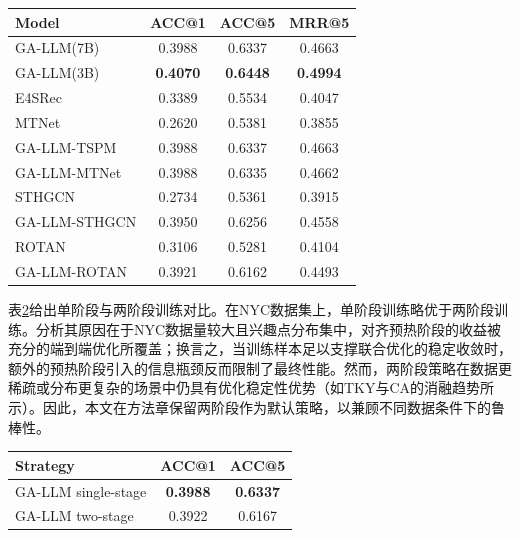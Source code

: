 \begin{table}[htbp]
    \tblstyle
    \label{tab:c4-llm-scale}
    \begin{tabular}{lccc}
        \toprule
        Model & ACC@1 & ACC@5 & MRR@5 \\
        \midrule
        GA-LLM(7B) & 0.3988 & 0.6337 & 0.4663 \\
        GA-LLM(3B) & \textbf{0.4070} & \textbf{0.6448} & \textbf{0.4994} \\
        E4SRec & 0.3389 & 0.5534 & 0.4047 \\
        MTNet & 0.2620 & 0.5381 & 0.3855 \\
        GA-LLM-TSPM & 0.3988 & 0.6337 & 0.4663 \\
        GA-LLM-MTNet & 0.3988 & 0.6335 & 0.4662 \\
        STHGCN & 0.2734 & 0.5361 & 0.3915 \\
        GA-LLM-STHGCN & 0.3950 & 0.6256 & 0.4558 \\
        ROTAN & 0.3106 & 0.5281 & 0.4104 \\
        GA-LLM-ROTAN & 0.3921 & 0.6162 & 0.4493 \\
        \bottomrule
    \end{tabular}
\end{table}

表\ref{tab:c4-train-strategy}给出单阶段与两阶段训练对比。在NYC数据集上，单阶段训练略优于两阶段训练。分析其原因在于NYC数据量较大且兴趣点分布集中，对齐预热阶段的收益被充分的端到端优化所覆盖；换言之，当训练样本足以支撑联合优化的稳定收敛时，额外的预热阶段引入的信息瓶颈反而限制了最终性能。然而，两阶段策略在数据更稀疏或分布更复杂的场景中仍具有优化稳定性优势（如TKY与CA的消融趋势所示）。因此，本文在方法章保留两阶段作为默认策略，以兼顾不同数据条件下的鲁棒性。

\begin{table}[htbp]
    \tblstyle
    \label{tab:c4-train-strategy}
    \begin{tabular}{lcc}
        \toprule
        Strategy & ACC@1 & ACC@5 \\
        \midrule
        GA-LLM single-stage & \textbf{0.3988} & \textbf{0.6337} \\
        GA-LLM two-stage & 0.3922 & 0.6167 \\
        \bottomrule
    \end{tabular}
\end{table}

